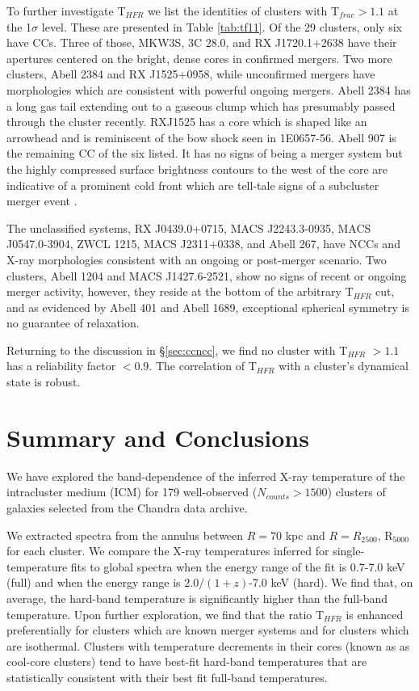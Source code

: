 \documentclass{emulateapj}
\newcommand{\tf}{T$_{HFR}$ }
\begin{document}
To further investigate \tf we list the identities of 
clusters with T$_{frac} > 1.1$ at the 1$\sigma$ level. These are
presented in Table \ref{tab:tf11}. Of the 29 clusters, only six have
CCs. Three of those, MKW3S, 3C 28.0, and RX J1720.1+2638 have their
apertures centered on the bright, dense cores in confirmed
mergers. Two more clusters, Abell 2384 and RX J1525+0958, while
unconfirmed mergers have morphologies which are consistent with
powerful ongoing mergers. Abell 2384 has a long gas tail extending out
to a gaseous clump which has presumably passed through the cluster
recently. RXJ1525 has a core which is shaped like an arrowhead and is
reminiscent of the bow shock seen in 1E0657-56. Abell 907 is the
remaining CC of the six listed. It has no signs of being a merger
system but the highly compressed surface brightness contours to the
west of the core are indicative of a prominent cold
front which are tell-tale signs of a subcluster merger event
\citep{2007PhR...443....1M}.

The unclassified systems, RX J0439.0+0715, MACS J2243.3-0935, MACS
J0547.0-3904, ZWCL 1215, MACS J2311+0338, and Abell 267, have NCCs and
X-ray morphologies consistent with an ongoing or post-merger
scenario. Two clusters, Abell 1204 and MACS J1427.6-2521, show no
signs of recent or ongoing merger activity, however, they reside at
the bottom of the arbitrary \tf cut, and as evidenced by Abell 401 and
Abell 1689, exceptional spherical symmetry is no guarantee of
relaxation.

Returning to the discussion in \S\ref{sec:ccncc}, we find no cluster
with \tf $> 1.1$ has a reliability factor $< 0.9$. The correlation of
\tf with a cluster's dynamical state is robust.

\section{Summary and Conclusions}\label{sec:summary}

We have explored the band-dependence of the inferred X-ray temperature
of the intracluster medium (ICM) for 179 well-observed ($N_{counts} >
1500$) clusters of galaxies selected from the Chandra data archive.

We extracted spectra from the annulus between $R=70$ kpc and
$R=R_{2500}$, R$_{5000}$ for each cluster. We compare the X-ray
temperatures inferred for single-temperature fits to global spectra
when the energy range of the fit is 0.7-7.0 keV (full) and when the
energy range is $2.0/(1+z)$-7.0 keV (hard). We find that, on
average, the hard-band temperature is significantly higher than
the full-band temperature. Upon further exploration, we find that
the ratio \tf is enhanced preferentially for clusters which are known
merger systems and for clusters which are isothermal. Clusters with
temperature decrements in their cores (known as as cool-core clusters)
tend to have best-fit hard-band temperatures that are statistically
consistent with their best fit full-band temperatures.
\end{document}
